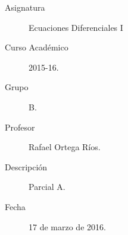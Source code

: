 \documentclass[12pt]{article}
\begin{document}

    
    

    \begin{description}
        \item[Asignatura] Ecuaciones Diferenciales I
        \item[Curso Académico] 2015-16.
        \item[Grupo] B.
        \item[Profesor] Rafael Ortega Ríos.
        \item[Descripción] Parcial A.
        \item[Fecha] 17 de marzo de 2016.
    
    \end{description}
    \newpage
    
\end{document}
